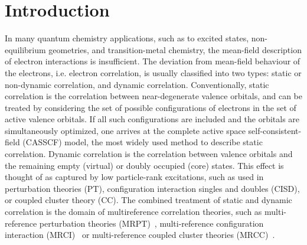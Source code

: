 
\section{Introduction}

In many quantum chemistry applications, such as to excited states, non-equilibrium geometries,
and transition-metal chemistry, the mean-field description of electron interactions is insufficient. 
The deviation from mean-field behaviour of the electrons, i.e. electron correlation, is usually classified
into two types: static or non-dynamic correlation, and dynamic correlation.
Conventionally, static correlation is the correlation between near-degenerate valence orbitals, and can be treated by
considering the set of possible configurations of electrons in the set of active valence orbitals.
If all such configurations are included and the orbitals are simultaneously optimized, one arrives at the complete active space
self-consistent-field (CASSCF) model\cite{das1972new, werner1980quadratically, werner1985second}, the most widely used method to describe static correlation.
Dynamic correlation is the correlation between valence orbitals and the remaining empty (virtual) or doubly occupied (core) states.
This effect is thought of
as captured by low particle-rank excitations, such as used in
perturbation theories (PT)\cite{bartlett1978many}, configuration interaction singles and doubles (CISD)\cite{shavitt1977method, purvis1982full}, or coupled cluster theory (CC)\cite{coester1958bound, taylor1978unlinked, bartlett1978many, pople1978electron, chiles1981electron, bartlett1989coupled}.
The combined treatment of static and dynamic correlation is the domain of multireference correlation theories, such as
multi-reference perturbation theories (MRPT)~\cite{andersson_second-order_1990}, multi-reference configuration interaction (MRCI)~\cite{lischka1981new, szalay2011multiconfiguration, lischka2001high} or multi-reference coupled cluster theories (MRCC)~\cite{buenker_individualized_1974, lindgren1978coupled, mukherjee1986linked, rittby1989multireference, stanton1992fock, kucharski1991hilbert, oliphant_multireference_1991}.


